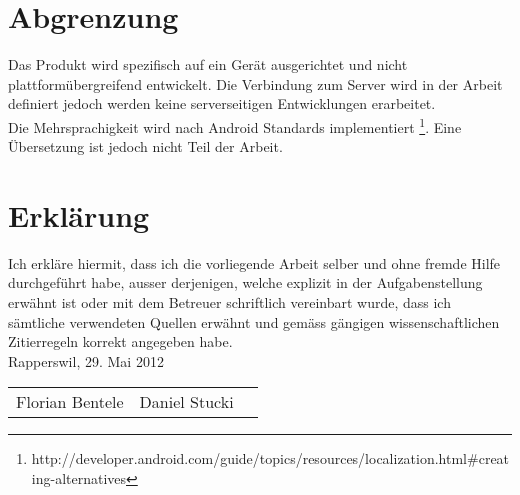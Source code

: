 \section*{Abgrenzung}
Das Produkt wird spezifisch auf ein Gerät ausgerichtet und nicht plattformübergreifend entwickelt. Die Verbindung zum Server wird in der Arbeit definiert jedoch werden keine serverseitigen Entwicklungen erarbeitet.
\\
Die Mehrsprachigkeit wird nach Android Standards implementiert \footnote{http://developer.android.com/guide/topics/resources/localization.html\#creating-alternatives}. Eine Übersetzung ist jedoch nicht Teil der Arbeit.

\section*{Erklärung}
Ich erkläre hiermit, dass ich die vorliegende Arbeit selber und ohne fremde Hilfe durchgeführt habe, ausser derjenigen, welche explizit in der Aufgabenstellung erwähnt ist oder mit dem Betreuer schriftlich vereinbart wurde, dass ich sämtliche verwendeten Quellen erwähnt und gemäss gängigen wissenschaftlichen Zitierregeln korrekt angegeben habe.
\\[1em]
Rapperswil, 29. Mai 2012
\\[1em]
\begin{tabular}{p{10cm}ll}
Florian Bentele & Daniel Stucki

\end{tabular}
